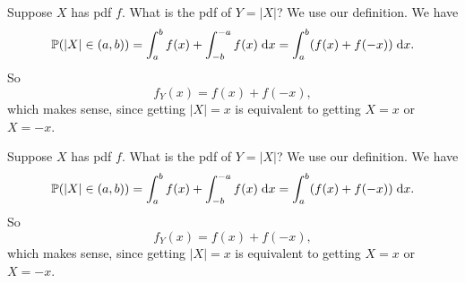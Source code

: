 \begin{note}
  \begin{field}
    \begin{eg}
      Suppose $X$ has pdf $f$. What is the pdf of $Y=|X|$?
      We use our definition. We have
      \[
        \mathbb{P}(|X| \in (a, b)) = \int_a^b f(x) + \int_{-b}^{-a} f(x)\;\mathrm{d} x = \int_a^b (f(x) + f(-x))\;\mathrm{d} x.
      \]
      So
      \[
        f_Y(x) = f(x) + f(-x),
      \]
      which makes sense, since getting $|X| = x$ is equivalent to getting $X = x$ or $X = -x$.
    \end{eg}
  \end{field}
  \begin{field}
    \begin{eg}
      Suppose $X$ has pdf $f$. What is the pdf of $Y=|X|$?
      We use our definition. We have
      \[
        \mathbb{P}(|X| \in (a, b)) = \int_a^b f(x) + \int_{-b}^{-a} f(x)\;\mathrm{d} x = \int_a^b (f(x) + f(-x))\;\mathrm{d} x.
      \]
      So
      \[
        f_Y(x) = f(x) + f(-x),
      \]
      which makes sense, since getting $|X| = x$ is equivalent to getting $X = x$ or $X = -x$.
    \end{eg}
  \end{field}
  \xplain{}%
\end{note}

